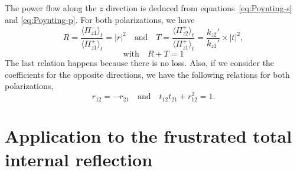 The power flow along the $z$ direction is deduced from equations~\ref{eq:Poynting-s} and \ref{eq:Poynting-p}.
For both polarizations, we have
$$
R = \frac{\langle \Pi_{z1}^- \rangle_t}{\langle \Pi_{z1}^+ \rangle_t}
= |r|^2
\quad\textrm{and}\quad
T = \frac{\langle \Pi_{z2}^+ \rangle_t}{\langle \Pi_{z1}^+ \rangle_t} 
= \frac{k_{z2}'}{k_{z1}'} \times |t|^2,
$$
$$\textrm{with}\quad
R+T=1
$$
The last relation happens because there is no loss.
%
Also, if we consider the coefficients for the opposite directions, we have the following relations for both polarizations,
$$ 
r_{12} = - r_{21} 
\quad\textrm{and}\quad
t_{12} t_{21} + r_{12}^2 = 1.
$$


\section{Application to the frustrated total internal reflection}

